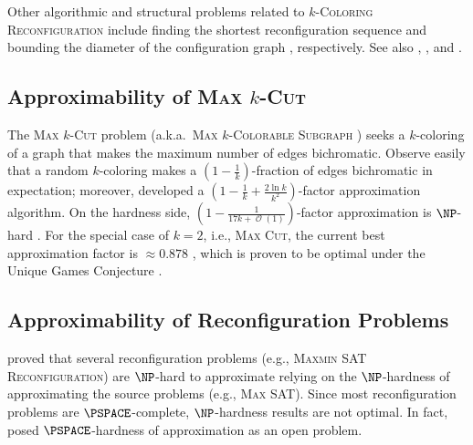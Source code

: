 \documentclass[11pt,fleqn]{article}
\newcommand{\prb}[1]{\textsc{#1}\xspace}
\DeclareMathOperator{\bigO}{\mathcal{O}}
\newcommand{\kColReconf}{\prb{$k$-Coloring Reconfiguration}}
\theoremstyle{definition}
\numberwithin{equation}{section}
\begin{document}
Other algorithmic and structural problems related to \kColReconf include
finding the shortest reconfiguration sequence \cite{cereceda2011finding,bonamy2020shortest,johnson2016finding} and
bounding the diameter of the configuration graph
\cite{cereceda2011finding,bonsma2009finding,bonamy2011diameter,bonamy2014reconfiguration}, respectively.
See also \citet[\S6]{nishimura2018introduction},
\citet[\S3]{heuvel13complexity}, and
\citet{mynhardt2019reconfiguration}.


\subsection{Approximability of \prb{Max $k$-Cut}}
The \prb{Max $k$-Cut} problem
(a.k.a.~\prb{Max $k$-Colorable Subgraph} \cite{papadimitriou1991optimization,guruswami2013improved})
seeks a $k$-coloring of a graph that makes the maximum number of edges bichromatic.
Observe easily that
a random $k$-coloring makes a $\left(1-\frac{1}{k}\right)$-fraction of edges bichromatic in expectation;
moreover, \citet{frieze1997improved} developed a $\left( 1-\frac{1}{k}+\frac{2 \ln k}{k^2} \right)$-factor approximation algorithm.
On the hardness side,
$\left( 1-\frac{1}{17k + \bigO(1)} \right)$-factor approximation is $\NP$-hard
\cite{kann1997hardness,guruswami2013improved,austrin2014new}.
For the special case of $k=2$, i.e., \prb{Max Cut},
the current best approximation factor is $\approx 0.878$ \cite{goemans1995improved},
which is proven to be optimal \cite{khot2007optimal,mossel2010noise}
under the Unique Games Conjecture \cite{khot2002power}.



\subsection{Approximability of Reconfiguration Problems}
\citet{ito2011complexity}
proved that several reconfiguration problems
(e.g., \prb{Maxmin SAT Reconfiguration})
are $\NP$-hard to approximate
relying on the $\NP$-hardness of approximating the source problems (e.g., \prb{Max SAT}).
Since most reconfiguration problems are $\PSPACE$-complete,
$\NP$-hardness results are not optimal.
In fact, \cite{ito2011complexity} posed $\PSPACE$-hardness of approximation as an open problem.
\end{document}
